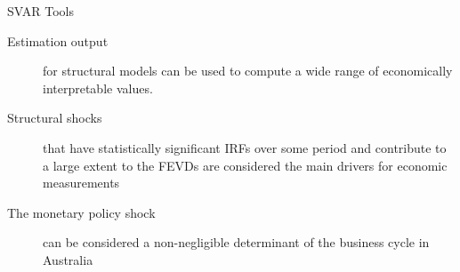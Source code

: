 \documentclass[notes,blackandwhite,mathsans,usenames,dvipsnames]{beamer}
\begin{document}
%
%
%
%
%





{
\begin{frame}{SVAR Tools}
\begin{description}
\item[Estimation output] {\color{mcxs2}for structural models can be used to compute a wide range of economically interpretable values.}

\bigskip\item[Structural shocks] {\color{mcxs2}that have statistically significant IRFs over some period and contribute to a large extent to the FEVDs are considered the main drivers for economic measurements}

\bigskip\item[The monetary policy shock] {\color{mcxs2}can be considered a non-negligible determinant of the business cycle in Australia}
\end{description}
\end{frame}
}
\end{document}
